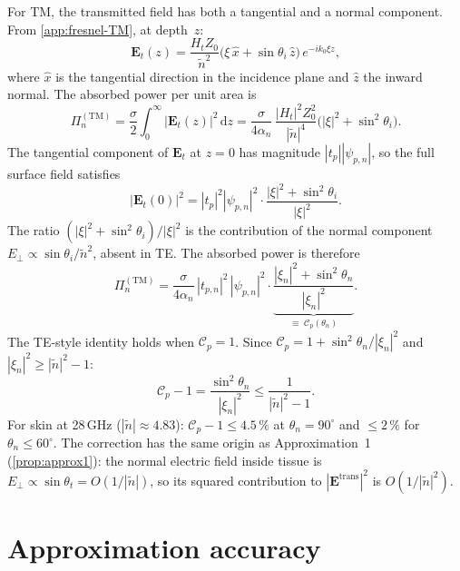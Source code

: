 \documentclass[11pt,a4paper]{article}
\theoremstyle{definition}      %
\newcommand{\diff}{\mathrm{d}}        %
\begin{document}
For TM, the transmitted field has both a tangential and a normal
component.  From \cref{app:fresnel-TM}, at depth~$z$:
\begin{equation}\label{eq:app-Et-TM}
  \mathbf{E}_t(z)
  = \frac{H_t Z_0}{\tilde{n}^2}
    \bigl(\xi\,\hat{x} + \sin\theta_i\,\hat{z}\bigr)\,
    e^{-ik_0\xi z},
\end{equation}
where $\hat{x}$ is the tangential direction in the incidence plane
and $\hat{z}$ the inward normal.  The absorbed power per unit area is
\begin{equation}
  \Pi_n^{(\mathrm{TM})}
  = \frac{\sigma}{2}\int_0^\infty |\mathbf{E}_t(z)|^2\,\diff z
  = \frac{\sigma}{4\alpha_n}\,
    \frac{|H_t|^2 Z_0^2}{|\tilde{n}|^4}
    \bigl(|\xi|^2 + \sin^2\!\theta_i\bigr).
\end{equation}
The tangential component of $\mathbf{E}_t$ at $z=0$ has magnitude
$|t_p||\psi_{p,n}|$, so the full surface field satisfies
\begin{equation}
  |\mathbf{E}_t(0)|^2
  = |t_p|^2|\psi_{p,n}|^2
    \cdot\frac{|\xi|^2 + \sin^2\!\theta_i}{|\xi|^2}.
\end{equation}
The ratio $(|\xi|^2+\sin^2\!\theta_i)/|\xi|^2$ is the contribution
of the normal component $E_\perp \propto \sin\theta_i/\tilde{n}^2$,
absent in TE.  The absorbed power is therefore
\begin{equation}\label{eq:app-depth-TM-exact}
  \Pi_n^{(\mathrm{TM})}
  = \frac{\sigma}{4\alpha_n}\,|t_{p,n}|^2\,|\psi_{p,n}|^2
    \cdot\underbrace{
      \frac{|\xi_n|^2 + \sin^2\!\theta_n}{|\xi_n|^2}
    }_{\displaystyle\equiv\;\mathcal{C}_p(\theta_n)}.
\end{equation}
The TE-style identity holds when $\mathcal{C}_p = 1$.  Since
$\mathcal{C}_p = 1 + \sin^2\!\theta_n/|\xi_n|^2$ and
$|\xi_n|^2 \geq |\tilde{n}|^2 - 1$:
\begin{equation}
  \mathcal{C}_p - 1 = \frac{\sin^2\!\theta_n}{|\xi_n|^2}
  \leq \frac{1}{|\tilde{n}|^2 - 1}.
\end{equation}
For skin at 28\,GHz ($|\tilde{n}|\approx 4.83$):
$\mathcal{C}_p - 1 \leq 4.5\,\%$ at $\theta_n = 90^\circ$ and
$\leq 2\,\%$ for $\theta_n \leq 60^\circ$.  The correction has the
same origin as Approximation~1 (\cref{prop:approx1}): the normal
electric field inside tissue is
$E_\perp \propto \sin\theta_t = O(1/|\tilde{n}|)$, so its squared
contribution to $|\mathbf{E}^\mathrm{trans}|^2$ is
$O(1/|\tilde{n}|^2)$.

\section{Approximation accuracy}\label{app:depth-coupling}
\end{document}
